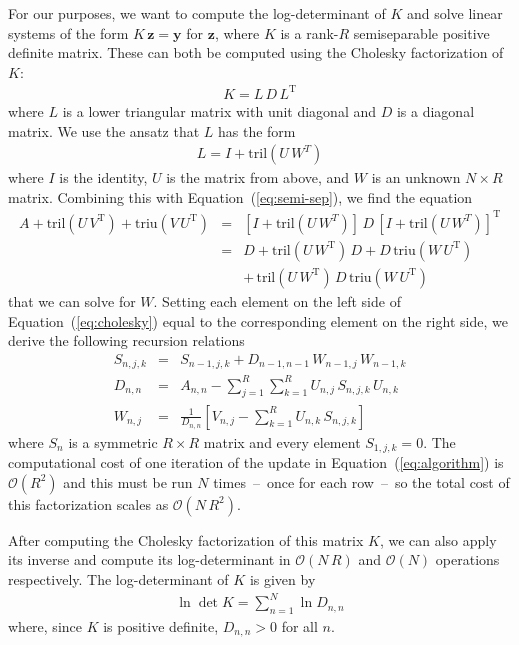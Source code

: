 \documentclass[manuscript, letterpaper]{aastex6}
\renewcommand{\eqref}[1]{\ref{eq:#1}}
\newcommand{\Eq}[1]{Equation~(\eqref{#1})}
\newcommand{\eq}[1]{\Eq{#1}}
\newcommand{\eqlabel}[1]{\label{eq:#1}}
\newcommand{\T}{\ensuremath{\mathrm{T}}}
\newcommand{\bvec}[1]{{\ensuremath{\boldsymbol{#1}}}}
\begin{document}
{For our purposes, we want to compute the log-determinant of $K$ and solve
linear systems of the form $K\,\bvec{z}=\bvec{y}$ for $\bvec{z}$, where $K$ is
a rank-$R$ semiseparable positive definite matrix.
These can both be computed using the Cholesky factorization of $K$:
\begin{eqnarray}
    K = L\,D\,L^\T
\end{eqnarray}
where $L$ is a lower triangular matrix with unit diagonal and $D$ is a
diagonal matrix.
We use the ansatz that $L$ has the form
\begin{eqnarray}
    L = I + \mathrm{tril} (U\,W^T)
\end{eqnarray}
where $I$ is the identity, $U$ is the matrix from above, and $W$ is an unknown
$N \times R$ matrix.
Combining this with \eq{semi-sep}, we find the equation
\begin{eqnarray}\eqlabel{cholesky}
    A + \mathrm{tril}(U\,V^\T) + \mathrm{triu}(V\,U^\T)
    &=& \left[I + \mathrm{tril} (U\,W^T)\right]\,D\,
    {\left[I + \mathrm{tril} (U\,W^T)\right]}^\T \\
    &=& D + \mathrm{tril}(U\,W^\T)\,D
    + D\,\mathrm{triu}(W\,U^\T) \nonumber\\
    && +\, \mathrm{tril}(U\,W^\T)\,D\,\mathrm{triu}(W\,U^\T) \nonumber
\end{eqnarray}
that we can solve for $W$.
Setting each element on the left side of \eq{cholesky} equal to the
corresponding element on the right side, we derive the following recursion
relations
\begin{eqnarray}
    S_{n,j,k} &=& S_{n-1,j,k} + D_{n-1,n-1}\,W_{n-1,j}\,W_{n-1,k} \nonumber\\
    D_{n,n} &=& A_{n,n} -
    \sum_{j=1}^{R}\sum_{k=1}^{R} U_{n,j}\,S_{n,j,k}\,U_{n,k}
    \nonumber\\
    W_{n,j} &=& \frac{1}{D_{n,n}}\left[ V_{n,j} -
    \sum_{k=1}^{R}U_{n,k}\,S_{n,j,k} \right]
    \eqlabel{algorithm}
\end{eqnarray}
where $S_n$ is a symmetric $R \times R$ matrix and every element
$S_{1,j,k}=0$.
The computational cost of one iteration of the update in \eq{algorithm} is
$\mathcal{O}(R^2)$ and this must be run $N$ times~--~once for each row~--~so
the total cost of this factorization scales as $\mathcal{O}(N\,R^2)$.

After computing the Cholesky factorization of this matrix $K$, we can also
apply its inverse and compute its log-determinant in $\mathcal{O}(N\,R)$ and
$\mathcal{O}(N)$ operations respectively.
The log-determinant of $K$ is given by
\begin{eqnarray}
    \ln \det K = \sum_{n=1}^N \ln D_{n,n}
\end{eqnarray}
where, since $K$ is positive definite, $D_{n,n}>0$ for all $n$.

}
\end{document}
